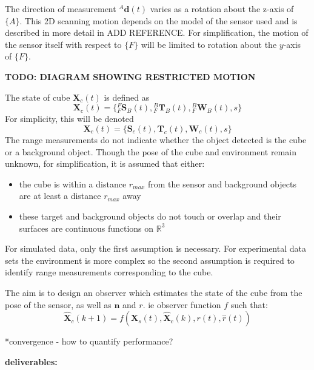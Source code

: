 The direction of measurement ${^{A}\mathbf{d}(t)}$ varies as a rotation about the z-axis of $\{A\}$. This 2D scanning motion depends on the model of the sensor used and is described in more detail in ADD REFERENCE. For simplification, the motion of the sensor itself with respect to $\{F\}$ will be limited to rotation about the $y$-axis of $\{F\}$.

\textbf{TODO: DIAGRAM SHOWING RESTRICTED MOTION}

The state of cube $\mathbf{X}_{c}(t)$ is defined as 
\begin{equation}
	\mathbf{X}_{c}(t) = 
	\{{^{F}_{F}\mathbf{S}^{}_{B}(t)},{^{B}_{F}\mathbf{T}^{}_{B}(t)},{^{B}_{F}\mathbf{W}^{}_{B}(t)},
	s\}
\end{equation}
For simplicity, this will be denoted
\begin{equation}
	\mathbf{X}_{c}(t) = 
	\{\mathbf{S}_{c}(t),\mathbf{T}_{c}(t),\mathbf{W}_{c}(t),s\}
\end{equation}
The range measurements do not indicate whether the object detected is the cube or a background object. Though the pose of the cube and environment remain unknown, for simplification, it is assumed that either:
\begin{itemize}
\item the cube is within a distance $r_{max}$ from the sensor and background objects are at least a distance $r_{max}$ away
\item these target and background objects do not touch or overlap and their surfaces are continuous functions on $\mathbb{R}^3$
\end{itemize}
For simulated data, only the first assumption is necessary. For experimental data sets the environment is more complex so the second assumption is required to identify range measurements corresponding to the cube. 

The aim is to design an observer which estimates the state of the cube from the pose of the sensor, as well as $\mathbf{n}$ and $r$. ie observer function $f$ such that:
\begin{equation}
	\hat{\mathbf{X}}_{c}(k+1) = f(\mathbf{X}_{s}(t),\hat{\mathbf{X}}_{c}(k),r(t),\hat{r}(t))
\end{equation}

*convergence - how to quantify performance?









\textbf{deliverables:} \\

